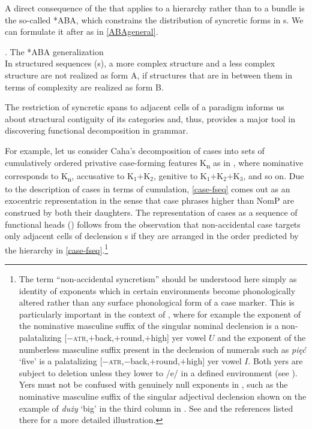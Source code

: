 A direct consequence of the  that applies to a  hierarchy rather than to a bundle is the so-called *ABA, which constrains the distribution of syncretic forms in s. We can formulate it after \cite{Bobaljik2007} as in \ref{ABAgeneral}.  


\ex. The *ABA generalization\label{ABAgeneral}\\[0.5ex]
In structured sequences (s), a more complex structure and a less complex structure are not realized as form A, if structures that are in between them in terms of complexity are realized as form B. 

The restriction of syncretic spans to adjacent cells of a paradigm informs us about structural contiguity of its categories and, thus, provides a major tool in discovering functional decomposition in grammar.
\par
For example, let us consider Caha's \citeyearpar{Caha2009} decomposition of cases into sets of cumulatively ordered privative case-forming features K\textsubscript{n} as in \Next, where nominative corresponds to K\textsubscript{n}, accusative to K$_{1}$$+$K$_{2}$, genitive to K$_{1}$$+$K$_{2}$$+$K$_{3}$, and so on.
Due to the description of cases in terms of  cumulation, \ref{case-fseq} comes out as an exocentric representation in the sense that case phrases higher than NomP are construed by both their daughters.
The representation of cases as a sequence of functional heads () follows from the observation that non-accidental case\linebreak{} targets only adjacent cells of declension s if they are arranged in the order predicted by the hierarchy in \ref{case-fseq}.\footnote{The term ``non-accidental syncretism'' should be understood here simply as identity of exponents which in certain environments become phonologically altered rather than any surface phonological form of a case marker. This is particularly important in the context of , where for example the exponent of the  nominative masculine suffix of the singular nominal declension is a non-palatalizing [$-$\textsc{atr},$+$back,$+$round,$+$high] yer vowel $U$ and the exponent of the numberless masculine suffix present in the declension of numerals such as \textit{pi\k{e}\'c} `five' is a palatalizing [$-$\textsc{atr},$-$back,$+$round,$+$high] yer vowel $I$. Both yers are subject to deletion unless they lower to /e/ in a defined environment (see \citealt{Guss1980,Rubach1984}). Yers must not be confused with genuinely null exponents in , such as the nominative masculine suffix of the singular adjectival declension shown on the example of \textit{du\.zy} `big' in the third column in . See \citet[35--38]{Wiland2009} and the references listed there for a more detailed illustration.
} %

